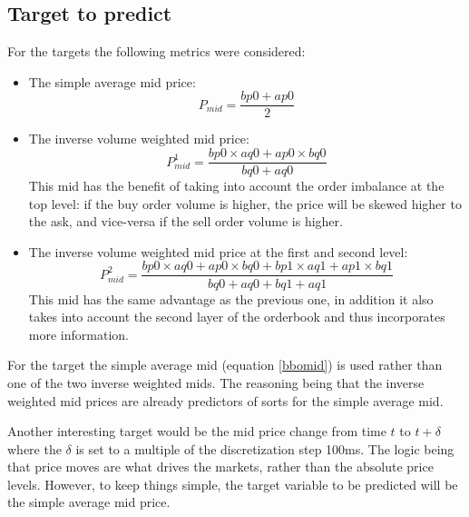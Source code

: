 \documentclass[english, 11pt, a4paper]{article}
\begin{document}
\subsection{Target to predict}
For the targets the following metrics were considered:
\begin{itemize}
    \item The simple average mid price:
        \begin{equation}
            P_{mid} = \frac{bp0 + ap0}{2} \label{bbomid}
        \end{equation}
    \item The inverse volume weighted mid price:
        \begin{equation}
            P_{mid}^1 = \frac{bp0\times aq0 + ap0 \times bq0}{bq0 + aq0} \label{invmid1}
        \end{equation}
        This mid has the benefit of taking into account the order imbalance at the top level: if
        the buy order volume is higher, the price will be skewed higher to the ask, and vice-versa
        if the sell order volume is higher.
    \item The inverse volume weighted mid price at the first and second level:
        \begin{equation}
            P_{mid}^2 = \frac{bp0\times aq0 + ap0 \times bq0 + bp1\times aq1 + ap1 \times bq1}{bq0 +
            aq0+bq1+aq1} \label{invmid2}
        \end{equation}
        This mid has the same advantage as the previous one, in addition it also takes into account the
        second layer of the orderbook and thus incorporates more information.
\end{itemize}

For the target the simple average mid (equation \ref{bbomid}) is used rather than one of the two
inverse weighted mids. The reasoning being that the inverse weighted mid prices are already predictors of sorts for the simple average mid. 

Another interesting target would be the mid price change from time $t$ to $t+\delta$ where the $\delta$
is set to a multiple of the discretization step 100ms. The logic being that price moves are what
drives the markets, rather than the absolute price levels. However, to keep things simple, the target
variable to be predicted will be the simple average mid price.
\end{document}
